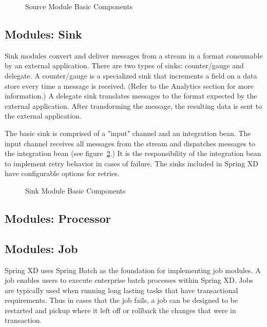 \par

\begin{figure}[ht]
\centering
{}
\caption{Source Module Basic Components}
\label{fig:sourcembc}
\end{figure}

\subsection{Modules: Sink}
Sink modules convert and deliver messages from a stream in a format consumable by an external application.
There are two types of sinks: counter/gauge and delegate.
A counter/gauge is a specialized sink that increments a field on a data store every time a
message is received. (Refer to the Analytics section for more information.)  A delegate
sink translates messages to the format expected by the external application.
After transforming the message, the resulting data is sent to the external application.

\par

The basic sink is comprised of a "input" channel and an integration bean.
The input channel receives all messages from the stream and dispatches
messages to the integration bean (see figure~\ref{fig:sinkmbc}.) It is the responsibility of
the integration bean to implement retry behavior in cases of failure. The sinks included
in Spring XD have configurable options for retries.

\par

\begin{figure}
\centering
{}
\caption{Sink Module Basic Components}
\label{fig:sinkmbc}
\end{figure}

\subsection{Modules: Processor}

\subsection{Modules: Job}
Spring XD uses Spring Batch \cite{spring-batch-reference} as the foundation for implementing
job modules. A job enables users to execute enterprise batch processes within Spring XD.
Jobs are typically used when running long lasting tasks that have transactional requirements.
Thus in cases that the job fails, a job can be designed to be restarted and
pickup where it left off or rollback the changes that were in transaction.

